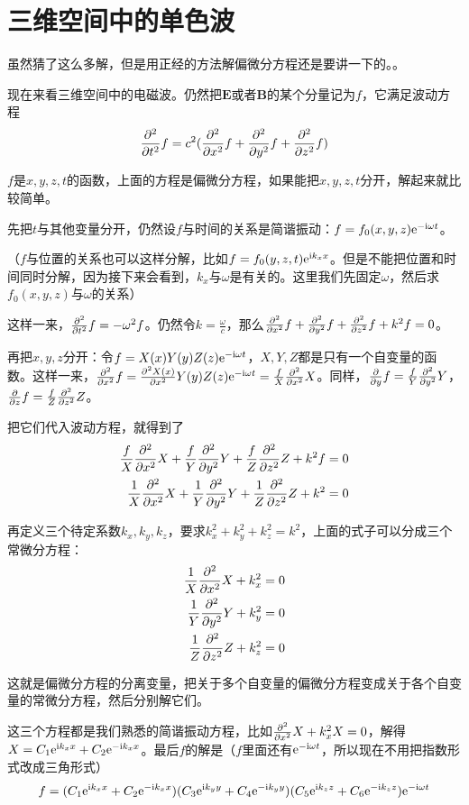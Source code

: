 \section{三维空间中的单色波}
虽然猜了这么多解，但是用正经的方法解偏微分方程还是要讲一下的。。

现在来看三维空间中的电磁波。仍然把$\mathbf{E}$或者$\mathbf{B}$的某个分量记为$f$，它满足波动方程
\begin{equation*}
\frac{\partial^{2}}{\partial t^{2}} f=c^2 (\frac{\partial^{2}}{\partial x^{2}} f+\frac{\partial^{2}}{\partial y^{2}} f+\frac{\partial^{2}}{\partial z^{2}} f)
\end{equation*}

$f$是$x,y,z,t$的函数，上面的方程是偏微分方程，如果能把$x,y,z,t$分开，解起来就比较简单。

先把$t$与其他变量分开，仍然设$f$与时间的关系是简谐振动：$f=f_0(x,y,z) \mathrm{e}^{-\mathrm{i} \omega t}$。

（$f$与位置的关系也可以这样分解，比如$f=f_0(y,z,t) \mathrm{e}^{\mathrm{i} k_x x}$。但是不能把位置和时间同时分解，因为接下来会看到，$k_x$与$\omega$是有关的。这里我们先固定$\omega$，然后求$f_0(x,y,z)$与$\omega$的关系）

这样一来，$\frac{\partial^{2}}{\partial t^{2}} f=-\omega^2 f$。仍然令$k=\frac{\omega}{c}$，那么$\frac{\partial^{2}}{\partial x^{2}} f+\frac{\partial^{2}}{\partial y^{2}} f+\frac{\partial^{2}}{\partial z^{2}} f+k^2 f=0$。

再把$x,y,z$分开：令$f=X(x) Y(y) Z(z) \mathrm{e}^{-\mathrm{i} \omega t}$，$X,Y,Z$都是只有一个自变量的函数。这样一来，$\frac{\partial^{2}}{\partial x^{2}} f=\frac{\partial^2 X(x)}{\partial x^2}  Y(y) Z(z) \mathrm{e}^{-\mathrm{i} \omega t}=\frac{f}{X} \frac{\partial^{2}}{\partial x^{2}} X$。同样，$\frac{\partial}{\partial y} f=\frac{f}{Y} \frac{\partial^{2}}{\partial y^{2}} Y$，$\frac{\partial}{\partial z} f=\frac{f}{Z} \frac{\partial^{2}}{\partial z^{2}} Z$。

把它们代入波动方程，就得到了
\begin{align*}
\frac{f}{X} \frac{\partial^{2}}{\partial x^{2}} X+\frac{f}{Y} \frac{\partial^{2}}{\partial y^{2}} Y+\frac{f}{Z} \frac{\partial^{2}}{\partial z^{2}} Z+k^2 f&=0 \\
\frac{1}{X} \frac{\partial^{2}}{\partial x^{2}} X+\frac{1}{Y} \frac{\partial^{2}}{\partial y^{2}} Y+\frac{1}{Z} \frac{\partial^{2}}{\partial z^{2}} Z+k^2&=0
\end{align*}

再定义三个待定系数$k_x,k_y,k_z$，要求$k_x^2+k_y^2+k_z^2=k^2$，上面的式子可以分成三个常微分方程：
\begin{align*}
\frac{1}{X} \frac{\partial^{2}}{\partial x^{2}} X+k_x^2&=0 \\
\frac{1}{Y} \frac{\partial^{2}}{\partial y^{2}} Y+k_y^2&=0 \\
\frac{1}{Z} \frac{\partial^{2}}{\partial z^{2}} Z+k_z^2&=0
\end{align*}

这就是偏微分方程的分离变量，把关于多个自变量的偏微分方程变成关于各个自变量的常微分方程，然后分别解它们。

这三个方程都是我们熟悉的简谐振动方程，比如$\frac{\partial^{2}}{\partial x^{2}} X+k_x^2 X=0$，解得$X=C_1 \mathrm{e}^{\mathrm{i} k_x x}+C_2 \mathrm{e}^{-\mathrm{i} k_x x}$。最后$f$的解是（$f$里面还有$\mathrm{e}^{-\mathrm{i} \omega t}$，所以现在不用把指数形式改成三角形式）
\begin{equation*}
f=(C_1 \mathrm{e}^{\mathrm{i} k_x x}+C_2 \mathrm{e}^{-\mathrm{i} k_x x})(C_3 \mathrm{e}^{\mathrm{i} k_y y}+C_4 \mathrm{e}^{-\mathrm{i} k_y y})(C_5 \mathrm{e}^{\mathrm{i} k_z z}+C_6 \mathrm{e}^{-\mathrm{i} k_z z}) \mathrm{e}^{-\mathrm{i} \omega t}
\end{equation*}

